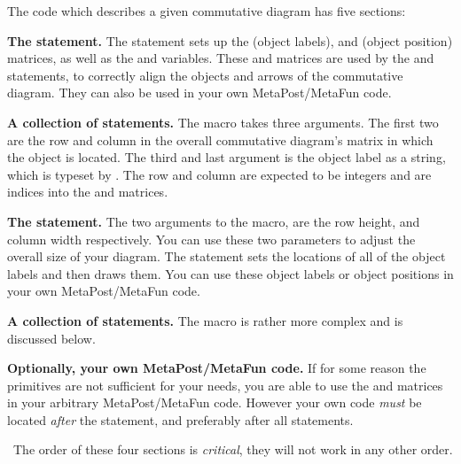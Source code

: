 The  code which describes a given commutative diagram has 
five sections: 

\startitemize[n]

\item {\bf The  statement.} The  
statement sets up the  (object labels), and  
(object position) matrices, as well as the  and 
 variables. These  and  matrices 
are used by the  and  statements, to 
correctly align the objects and arrows of the commutative diagram. They 
can also be used in your own MetaPost/MetaFun code. 

\item {\bf A collection of  statements.} The 
 macro takes three arguments. The first two are the row 
and column in the overall commutative diagram's matrix in which the object 
is located. The third and last argument is the object label as a string, 
which is typeset by \ConTeXt. The row and column are expected to be 
integers and are indices into the  and  
matrices. 

\item {\bf The  statement.} The two arguments to the 
 macro, are the row height, and column width 
respectively. You can use these two parameters to adjust the overall size 
of your diagram. The  statement sets the locations of 
all of the object labels and then draws them. You can use these object 
labels or object positions in your own MetaPost/MetaFun code. 

\item {\bf A collection of  statements.} The 
 macro is rather more complex and is discussed below. 

\item {\bf Optionally, your own MetaPost/MetaFun code.} If for some reason 
the  primitives are not sufficient for your needs, you 
are able to use the  and  matrices in your 
arbitrary MetaPost/MetaFun code. However your own code \emph{must} be 
located \emph{after} the  statement, and preferably 
after all  statements. 

\stopitemize

\noindent\ The order of these four sections is \emph{critical}, they will 
not work in any other order.

\stopchapter 